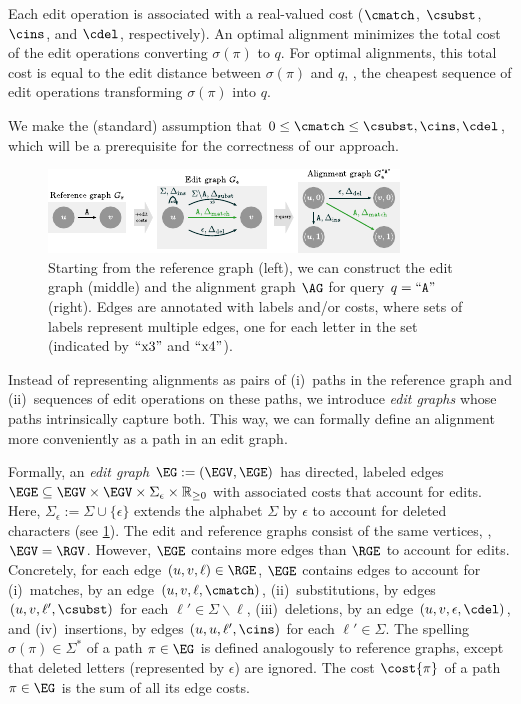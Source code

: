 Each edit operation is associated with a real-valued cost ($\cmatch$, $\csubst$,
$\cins$, and $\cdel$, respectively).
An optimal alignment minimizes the total cost of the edit operations converting
$\sigma(\pi)$ to $q$. For optimal alignments, this total cost is equal to the
edit distance between $\sigma(\pi)$ and $q$, \ie, the cheapest sequence of edit
operations transforming $\sigma(\pi)$ into $q$.

We make the (standard) assumption that $0 \leq \cmatch \leq \csubst, \cins,
\cdel$, which will be a prerequisite for the correctness of our approach.

\begin{figure}[t]
	\centering
	\includegraphics[width=0.8\columnwidth]{edit_graph}
	\caption[Constructing the alignment graph]{Starting from the reference graph (left), we can construct the edit graph (middle) and the alignment graph $\AG$ for query $q=``\texttt{A}"$ (right). Edges are annotated with labels and/or costs, where sets of labels represent multiple edges, one for each letter in the set (indicated by $``\text{x}3"$ and $``\text{x}4"$).}
	\label{TRIEfig:graph-constructions}
\end{figure}

Instead of representing alignments as pairs of (i)~paths in the reference graph and
(ii)~sequences of edit operations on these paths, we introduce \textit{edit
graphs} whose paths intrinsically capture both. This way, we can
formally define an alignment more conveniently as a path in an edit graph.

Formally, an \emph{edit graph} $\EG:=(\EGV,\EGE)$ has directed, labeled edges
$\EGE \subseteq \EGV \times \EGV \times \Sigma_\epsilon \times \mathbb{R}_{\geq
0}$ with associated costs that account for edits. Here, $\Sigma_\epsilon :=
\Sigma \cup \{\epsilon\}$ extends the alphabet $\Sigma$ by $\epsilon$ to account
for deleted characters (see \cref{TRIEfig:graph-constructions}).
%
The edit and reference graphs consist
of the same vertices, \ie, $\EGV=\RGV$. However, $\EGE$ contains more edges
than $\RGE$ to account for edits.
%
Concretely, for each edge $(u,v,\ell) \in \RGE$, $\EGE$ contains edges to
account for (i)~matches, by an edge $(u,v,\ell,\cmatch)$, (ii)~substitutions, by
edges $(u,v,\ell',\csubst)$ for each $\ell' \in \Sigma \backslash \ell$,
(iii)~deletions, by an edge $(u,v,\epsilon,\cdel)$, and (iv)~insertions, by
edges $(u,u,\ell',\cins)$ for each $\ell' \in \Sigma$.
%
The spelling $\sigma(\pi) \in \Sigma^*$ of a path $\pi \in \EG$ is defined
analogously to reference graphs, except that deleted letters (represented by
$\epsilon$) are ignored. The cost $\cost{\pi}$ of a path $\pi \in \EG$ is the
sum of all its edge costs.

